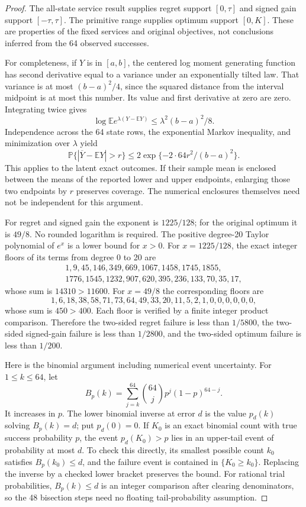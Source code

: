 \begin{proof}
The all-state service result supplies
regret support \([0,\tau]\) and
signed gain support \([-\tau,\tau]\).
The primitive range supplies
optimum support \([0,K]\).
These are properties of the fixed
services and original objectives,
not conclusions inferred from the
64 observed successes.

For completeness, if \(Y\) is in
\([a,b]\), the centered log moment
generating function has second
derivative equal to a variance
under an exponentially tilted law.
That variance is at most
\((b-a)^2/4\), since the squared
distance from the interval midpoint
is at most this number.
Its value and first derivative at
zero are zero.  Integrating twice
gives
\[
 \log\mathbb E e^{\lambda(Y-\mathbb EY)}
                         \leq\lambda^2(b-a)^2/8.
\]
Independence across the 64 state
rows, the exponential Markov
inequality, and minimization over
\(\lambda\) yield
\[
 \mathbb P\{|\overline Y-\mathbb EY|>r\}
               \leq2\exp\{-2\cdot64r^2/(b-a)^2\}.
\]
This applies to the latent exact
outcomes.  If their sample mean
is enclosed between the means of
the reported lower and upper
endpoints, enlarging those two
endpoints by \(r\) preserves
coverage.  The numerical
enclosures themselves need not
be independent for this argument.

For regret and signed gain the
exponent is \(1225/128\); for the
original optimum it is \(49/8\).
No rounded logarithm is required.
The positive degree-20 Taylor
polynomial of \(e^x\) is a lower
bound for \(x>0\).
For \(x=1225/128\), the exact
integer floors of its terms
from degree 0 to 20 are
\[
 \begin{gathered}
 1,9,45,146,349,669,1067,1458,1745,1855,\\
 1776,1545,1232,907,620,395,236,133,70,35,17,
 \end{gathered}
\]
whose sum is \(14310>11600\).
For \(x=49/8\) the corresponding
floors are
\[
 1,6,18,38,58,71,73,64,49,33,20,11,5,2,1,
 0,0,0,0,0,0,
\]
whose sum is \(450>400\).
Each floor is verified by a
finite integer product comparison.
Therefore the two-sided regret
failure is less than \(1/5800\),
the two-sided signed-gain failure
is less than \(1/2800\), and the
two-sided optimum failure is
less than \(1/200\).

Here is the binomial argument
including numerical event
uncertainty.  For \(1\leq k\leq64\),
let
\[
 B_p(k)=\sum_{j=k}^{64}{64\choose j}
                               p^j(1-p)^{64-j}.
\]
It increases in \(p\).
The lower binomial inverse at
error \(d\) is the value
\(p_d(k)\) solving \(B_p(k)=d\);
put \(p_d(0)=0\).
If \(K_0\) is an exact binomial
count with true success
probability \(p\), the event
\(p_d(K_0)>p\) lies in an
upper-tail event of probability
at most \(d\).
To check this directly, its
smallest possible count \(k_0\)
satisfies \(B_p(k_0)\leq d\),
and the failure event is
contained in \(\{K_0\geq k_0\}\).
Replacing the inverse by a
checked lower bracket preserves
the bound.
For rational trial probabilities,
\(B_p(k)\leq d\) is an integer
comparison after clearing
denominators, so the 48
bisection steps need no
floating tail-probability
assumption.


\end{proof}
